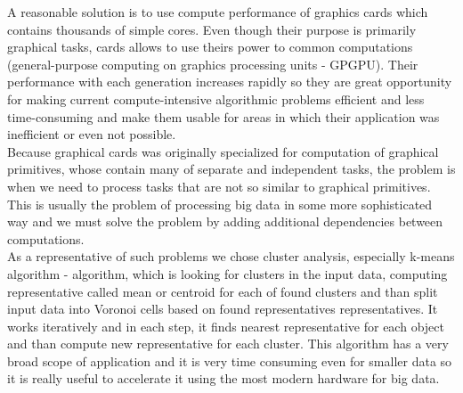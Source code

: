 A reasonable solution is to use compute performance of graphics cards which contains thousands of simple cores. Even though their purpose is primarily graphical tasks, cards allows to use theirs power to common computations (general-purpose computing on graphics processing units - GPGPU). Their performance with each generation increases rapidly so they are great opportunity for making current compute-intensive algorithmic problems efficient and less time-consuming and make them usable for areas in which their application was inefficient or even not possible.\\
Because graphical cards was originally specialized for computation of graphical primitives, whose contain many of separate and independent tasks, the problem is when we need to process tasks that are not so similar to graphical primitives. This is usually the problem of processing big data in some more sophisticated way and we must solve the problem by adding additional dependencies between computations. \\

As a representative of such problems we chose cluster analysis, especially k-means algorithm - algorithm, which is looking for clusters in the input data, computing representative called mean or centroid for each of found clusters and than split input data into Voronoi cells based on found representatives representatives. It works iteratively and in each step, it finds nearest representative for each object and than compute new representative for each cluster. This algorithm has a very broad scope of application and it is very time consuming even for smaller data so it is really useful to accelerate it using the most modern hardware for big data.\\


